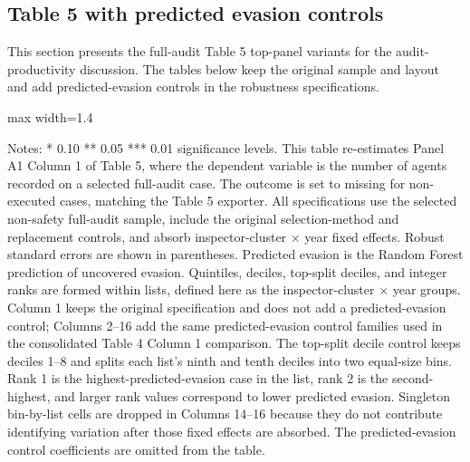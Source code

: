 \documentclass{article}
\newcommand{\OutPath}{Output/}%
\newcommand{\OutPath}{../Output/}%
\begin{document}
\begin{landscape}
\subsection{Table 5 with predicted evasion controls}

This section presents the full-audit Table 5 top-panel variants for the audit-productivity discussion. The tables below keep the original sample and layout and add predicted-evasion controls in the robustness specifications.

\begin{table}[H]\centering
\begin{adjustbox}{max width=1.4\textwidth}
\begin{threeparttable}
\caption{Table 5 Panel A1 Column 1: Number of Agents Varying Predicted Evasion Control Specification}
\label{tab:table5_col1_ninspectors_predicted_evasion_control_comparison}

\footnotesize


\begin{tablenotes}[flushleft]
\footnotesize
\item Notes: * 0.10 ** 0.05 *** 0.01 significance levels. This table re-estimates Panel A1 Column 1 of Table 5, where the dependent variable is the number of agents recorded on a selected full-audit case. The outcome is set to missing for non-executed cases, matching the Table 5 exporter. All specifications use the selected non-safety full-audit sample, include the original selection-method and replacement controls, and absorb inspector-cluster $\times$ year fixed effects. Robust standard errors are shown in parentheses. Predicted evasion is the Random Forest prediction of uncovered evasion. Quintiles, deciles, top-split deciles, and integer ranks are formed within lists, defined here as the inspector-cluster $\times$ year groups. Column 1 keeps the original specification and does not add a predicted-evasion control; Columns 2--16 add the same predicted-evasion control families used in the consolidated Table 4 Column 1 comparison. The top-split decile control keeps deciles 1--8 and splits each list's ninth and tenth deciles into two equal-size bins. Rank 1 is the highest-predicted-evasion case in the list, rank 2 is the second-highest, and larger rank values correspond to lower predicted evasion. Singleton bin-by-list cells are dropped in Columns 14--16 because they do not contribute identifying variation after those fixed effects are absorbed. The predicted-evasion control coefficients are omitted from the table.
\end{tablenotes}
\end{threeparttable}
\end{adjustbox}
\end{table}


\end{landscape}
\end{document}
